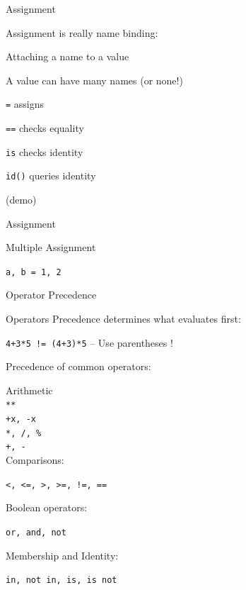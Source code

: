 \documentclass{beamer}
\begin{document}
\begin{frame}[fragile]{Assignment}

{\large Assignment is really name binding: }

Attaching a name to a value

A value can have many names (or none!)

\vspace{0.2in}
\verb+=+ assigns

\vspace{0.2in}
\verb+==+ checks equality

\vspace{0.2in}
\verb+is+ checks identity

\vspace{0.2in}
\verb+id()+ queries identity

\vspace{0.2in}
(demo)

\end{frame}

\begin{frame}[fragile]{Assignment}

{\Large  Multiple Assignment

\vspace{0.25in}

\verb+a, b = 1, 2+
}

\end{frame}


\begin{frame}[fragile]{Operator Precedence}

Operators Precedence determines what evaluates first:

\verb^4+3*5 != (4+3)*5^  --  Use parentheses !

Precedence of common operators:

Arithmetic \\
\verb!**! \\
\verb!+x, -x! \\	
\verb!*, /, %!	\\
\verb!+, -! \\

Comparisons:

\verb^<, <=, >, >=, !=, ==^

Boolean operators:
 
\verb!or, and, not!

Membership and Identity:

\verb!in, not in, is, is not!

\end{frame}
\end{document}
